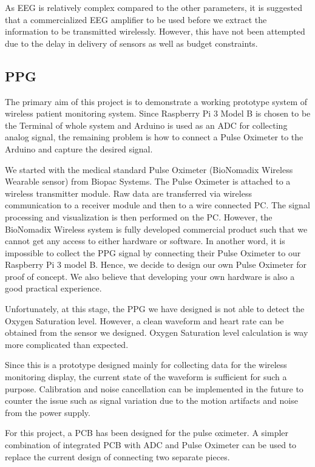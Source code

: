 As EEG is relatively complex compared to the other parameters, it is suggested that a commercialized EEG amplifier to be used before we extract the information to be transmitted wirelessly. However, this have not been attempted due to the delay in delivery of sensors as well as budget constraints. 

\subsection{PPG}

The primary aim of this project is to demonstrate a working prototype system of wireless patient monitoring system. Since Raspberry Pi 3 Model B is chosen to be the Terminal of whole system and Arduino is used as an ADC for collecting analog signal, the remaining problem is how to connect a Pulse Oximeter to the Arduino and capture the desired signal. 

We started with the medical standard Pulse Oximeter (BioNomadix Wireless Wearable sensor) from Biopac Systems. The Pulse Oximeter is attached to a wireless transmitter module. Raw data are transferred via wireless communication to a receiver module and then to a wire connected PC. The signal processing and visualization is then performed on the PC. However, the BioNomadix Wireless system is fully developed commercial product such that we cannot get any access to either hardware or software. In another word, it is impossible to collect the PPG signal by connecting their Pulse Oximeter to our Raspberry Pi 3 model B. Hence, we decide to design our own Pulse Oximeter for proof of concept. We also believe that developing your own hardware is also a good practical experience.

Unfortunately, at this stage, the PPG we have designed is not able to detect the Oxygen Saturation level. However, a clean waveform and heart rate can be obtained from the sensor we designed. Oxygen Saturation level calculation is way more complicated than expected. 

Since this is a prototype designed mainly for collecting data for the wireless monitoring display, the current state of the waveform is sufficient for such a purpose. Calibration and noise cancellation can be implemented in the future to counter the issue such as signal variation due to the motion artifacts and noise from the power supply.

For this project, a PCB has been designed for the pulse oximeter. A simpler combination of integrated PCB with ADC and Pulse Oximeter can be used to replace the current design of connecting two separate pieces.

